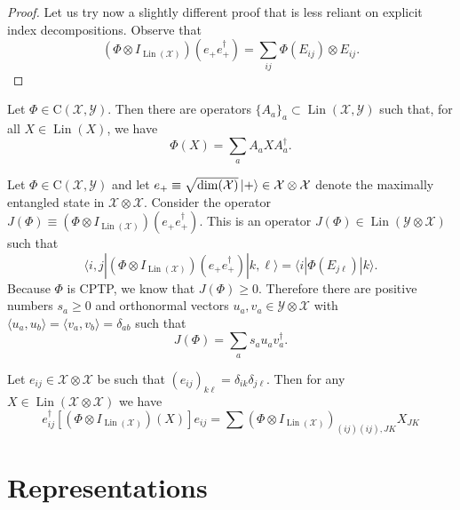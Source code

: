 \documentclass[12pt]{report}
\newcommand{\calY}{{\mathcal{Y}}}
\newcommand{\calX}{{\mathcal{X}}}
\newcommand{\rmC}{{\mathrm{C}}}
\DeclareMathOperator{\Lin}{Lin}
\begin{document}
\begin{proof}
	Let us try now a slightly different proof that is less reliant on explicit index decompositions.
	Observe that
	\begin{equation}
		(\Phi\otimes I_{\Lin(\calX)})(e_+ e_+^\dagger)
		= \sum_{ij} \Phi(E_{ij}) \otimes E_{ij}.
	\end{equation}
\end{proof}

\begin{prop}
	Let $\Phi\in\rmC(\calX,\calY)$. Then there are operators $\{A_a\}_a\subset\Lin(\calX,\calY)$ such that, for all $X\in\Lin(X)$, we have
	\begin{equation}
		\Phi(X) = \sum_a A_a X A_a^\dagger.
	\end{equation}

\end{prop}

Let $\Phi\in\rmC(\calX,\calY)$ and let $e_+\equiv \sqrt{\dim(\calX)}\ket +\in\calX\otimes\calX$ denote the maximally entangled state in $\calX\otimes\calX$.
Consider the operator $J(\Phi)\equiv (\Phi\otimes I_{\Lin(\calX)})(e_+ e_+^\dagger)$.
This is an operator $J(\Phi)\in\Lin(\calY\otimes\calX)$ such that
\begin{equation}
	\langle i,j| (\Phi\otimes I_{\Lin(\calX)})(e_+ e_+^\dagger) |k,\ell\rangle
	= \langle i | \Phi(E_{j\ell}) | k\rangle.
\end{equation}
Because $\Phi$ is CPTP, we know that $J(\Phi)\ge0$.
Therefore there are positive numbers $s_a\ge0$ and orthonormal vectors $u_a,v_a\in\calY\otimes\calX$ with $\langle u_a,u_b\rangle=\langle v_a,v_b\rangle = \delta_{ab}$ such that
\begin{equation}
	J(\Phi) = \sum_a s_a u_a v_a^\dagger.
\end{equation}

Let $e_{ij}\in \calX\otimes\calX$ be such that $(e_{ij})_{k\ell}=\delta_{ik}\delta_{j\ell}$. Then for any $X\in\Lin(\calX\otimes\calX)$ we have
\begin{equation}
	e_{ij}^\dagger  [(\Phi\otimes I_{\Lin(\calX)})(X)] e_{ij}
	= \sum (\Phi\otimes I_{\Lin(\calX)})_{(ij)(ij),JK} X_{JK}
\end{equation}

\section{Representations}
\end{document}
